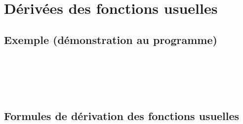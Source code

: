 \section{Dérivées des fonctions usuelles}

\subsection{Exemple (démonstration au programme)}
\begin{bdemo}
    \pointille[\textwidth-1cm]
\end{bdemo}

\begin{bdefi}
    \pointille[\textwidth-1cm]\\
    \pointille[\textwidth-1cm]\\
    \pointille[\textwidth-1cm]\\
    \pointille[\textwidth-1cm]\\
\end{bdefi}

\subsection{Formules de dérivation des fonctions usuelles}


